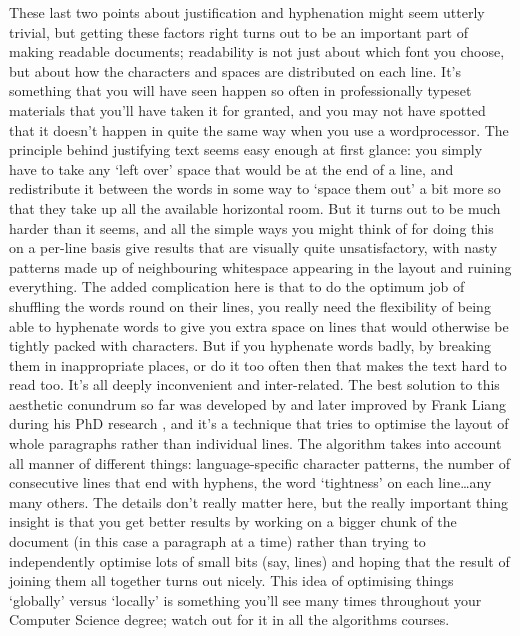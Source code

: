 \begin{refsection}
These last two points about justification and hyphenation might seem utterly trivial, but getting these factors right turns out to be an important part of making readable documents; readability is not just about which font you choose, but about how the characters and spaces are distributed on each line. It's something that you will have seen happen so often in professionally typeset materials that you'll have taken it for granted, and you may not have spotted that it doesn't happen in quite the same way when you use a wordprocessor. The principle behind justifying text seems easy enough at first glance: you simply have to take any `left over' space that would be at the end of a line, and redistribute it between the words in some way to `space them out' a bit more so that they take up all the available horizontal room. But it turns out to be much harder than it seems, and all the simple ways you might think of for doing this on a per-line basis give results that are visually quite unsatisfactory, with nasty patterns made up of neighbouring whitespace appearing in the layout and ruining everything. The added complication here is that to do the optimum job of shuffling the words round on their lines, you really need the flexibility of being able to hyphenate words to give you extra space on lines that would otherwise be tightly packed with characters. But if you hyphenate words badly, by breaking them in inappropriate places, or do it too often then that makes the text hard to read too. It's all deeply inconvenient and inter-related. The best solution to this aesthetic conundrum so far was developed by \cite{SPE:SPE4380111102} and later improved by Frank Liang during his PhD research \citep{liang}, and it's a technique that tries to optimise the layout of whole paragraphs rather than individual lines. The algorithm takes into account all manner of different things: language-specific character patterns, the number of consecutive lines that end with hyphens, the word `tightness' on each line\ldots any many others. The details don't really matter here, but the really important thing insight is that you get better results by working on a bigger chunk of the document (in this case a paragraph at a time) rather than trying to independently optimise lots of small bits (say, lines) and hoping that the result of joining them all together turns out nicely. This idea of optimising things `globally' versus `locally' is something you'll see many times throughout your Computer Science degree; watch out for it in all the algorithms courses.


\end{refsection}
